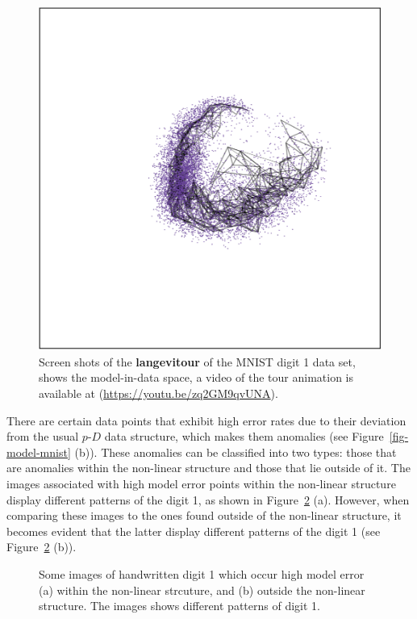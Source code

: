 \documentclass[
  12pt]{article}
\newcommand\pD{$p\text{-}D$}
\begin{document}
\begin{figure}[H]
%
\begin{minipage}{0.33\linewidth}
\includegraphics{figures/mnist/sc_3.png}\end{minipage}%

\caption{\label{fig-mnist1_sc}Screen shots of the \textbf{langevitour}
of the MNIST digit 1 data set, shows the model-in-data space, a video of
the tour animation is available at
(\url{https://youtu.be/zq2GM9qvUNA}).}

\end{figure}%

There are certain data points that exhibit high error rates due to their
deviation from the usual \pD{} data structure, which makes them
anomalies (see Figure~\ref{fig-model-mnist} (b)). These anomalies can be
classified into two types: those that are anomalies within the
non-linear structure and those that lie outside of it. The images
associated with high model error points within the non-linear structure
display different patterns of the digit 1, as shown in
Figure~\ref{fig-mnist-anomalies} (a). However, when comparing these
images to the ones found outside of the non-linear structure, it becomes
evident that the latter display different patterns of the digit 1 (see
Figure~\ref{fig-mnist-anomalies} (b)).

\begin{figure}[H]


\caption{\label{fig-mnist-anomalies}Some images of handwritten digit 1
which occur high model error (a) within the non-linear strcuture, and
(b) outside the non-linear structure. The images shows different
patterns of digit 1.}

\end{figure}%
\end{document}
